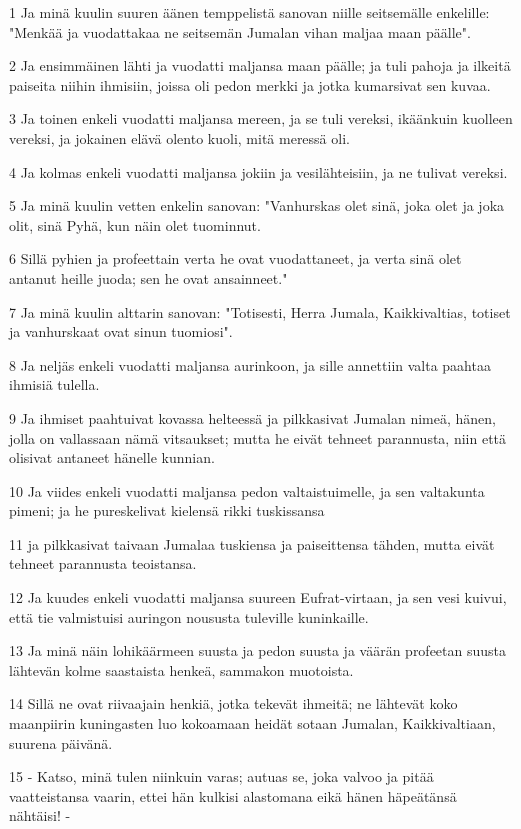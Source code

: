 \par 1 Ja minä kuulin suuren äänen temppelistä sanovan niille seitsemälle enkelille: "Menkää ja vuodattakaa ne seitsemän Jumalan vihan maljaa maan päälle".
\par 2 Ja ensimmäinen lähti ja vuodatti maljansa maan päälle; ja tuli pahoja ja ilkeitä paiseita niihin ihmisiin, joissa oli pedon merkki ja jotka kumarsivat sen kuvaa.
\par 3 Ja toinen enkeli vuodatti maljansa mereen, ja se tuli vereksi, ikäänkuin kuolleen vereksi, ja jokainen elävä olento kuoli, mitä meressä oli.
\par 4 Ja kolmas enkeli vuodatti maljansa jokiin ja vesilähteisiin, ja ne tulivat vereksi.
\par 5 Ja minä kuulin vetten enkelin sanovan: "Vanhurskas olet sinä, joka olet ja joka olit, sinä Pyhä, kun näin olet tuominnut.
\par 6 Sillä pyhien ja profeettain verta he ovat vuodattaneet, ja verta sinä olet antanut heille juoda; sen he ovat ansainneet."
\par 7 Ja minä kuulin alttarin sanovan: "Totisesti, Herra Jumala, Kaikkivaltias, totiset ja vanhurskaat ovat sinun tuomiosi".
\par 8 Ja neljäs enkeli vuodatti maljansa aurinkoon, ja sille annettiin valta paahtaa ihmisiä tulella.
\par 9 Ja ihmiset paahtuivat kovassa helteessä ja pilkkasivat Jumalan nimeä, hänen, jolla on vallassaan nämä vitsaukset; mutta he eivät tehneet parannusta, niin että olisivat antaneet hänelle kunnian.
\par 10 Ja viides enkeli vuodatti maljansa pedon valtaistuimelle, ja sen valtakunta pimeni; ja he pureskelivat kielensä rikki tuskissansa
\par 11 ja pilkkasivat taivaan Jumalaa tuskiensa ja paiseittensa tähden, mutta eivät tehneet parannusta teoistansa.
\par 12 Ja kuudes enkeli vuodatti maljansa suureen Eufrat-virtaan, ja sen vesi kuivui, että tie valmistuisi auringon noususta tuleville kuninkaille.
\par 13 Ja minä näin lohikäärmeen suusta ja pedon suusta ja väärän profeetan suusta lähtevän kolme saastaista henkeä, sammakon muotoista.
\par 14 Sillä ne ovat riivaajain henkiä, jotka tekevät ihmeitä; ne lähtevät koko maanpiirin kuningasten luo kokoamaan heidät sotaan Jumalan, Kaikkivaltiaan, suurena päivänä.
\par 15 - Katso, minä tulen niinkuin varas; autuas se, joka valvoo ja pitää vaatteistansa vaarin, ettei hän kulkisi alastomana eikä hänen häpeätänsä nähtäisi! -
